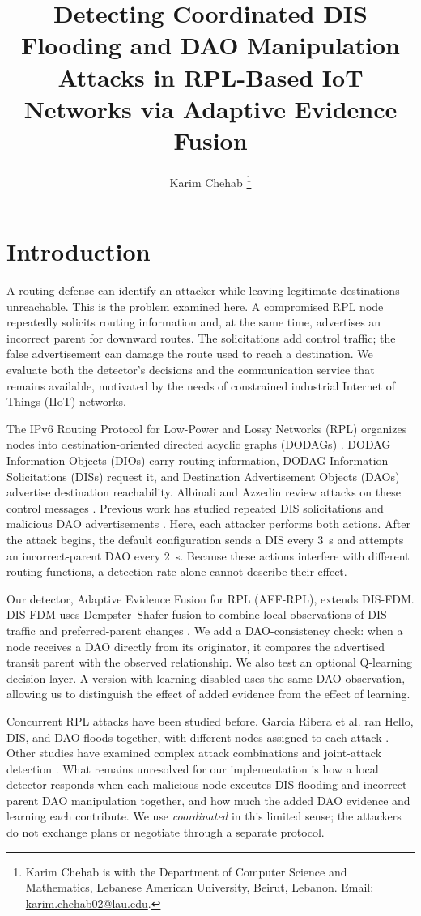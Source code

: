 \documentclass[journal]{IEEEtran}
\title{Detecting Coordinated DIS Flooding and DAO Manipulation Attacks in RPL-Based IoT Networks via Adaptive Evidence Fusion}
\author{Karim Chehab%
\thanks{Karim Chehab is with the Department of Computer Science and Mathematics, Lebanese American University, Beirut, Lebanon. Email: \href{mailto:karim.chehab02@lau.edu}{karim.chehab02@lau.edu}.}}
\date{}
\begin{document}
\maketitle

\section{Introduction}\label{sec:introduction}
A routing defense can identify an attacker while leaving legitimate destinations unreachable. This is the problem examined here. A compromised RPL node repeatedly solicits routing information and, at the same time, advertises an incorrect parent for downward routes. The solicitations add control traffic; the false advertisement can damage the route used to reach a destination. We evaluate both the detector's decisions and the communication service that remains available, motivated by the needs of constrained industrial Internet of Things (IIoT) networks.

The IPv6 Routing Protocol for Low-Power and Lossy Networks (RPL) organizes nodes into destination-oriented directed acyclic graphs (DODAGs) \cite{rfc6550}. DODAG Information Objects (DIOs) carry routing information, DODAG Information Solicitations (DISs) request it, and Destination Advertisement Objects (DAOs) advertise destination reachability. Albinali and Azzedin review attacks on these control messages \cite{albinali2024}. Previous work has studied repeated DIS solicitations \cite{rajasekar2022,vermaranga2020,medjek2021} and malicious DAO advertisements \cite{pu2018,limsd2024}. Here, each attacker performs both actions. After the attack begins, the default configuration sends a DIS every 3~s and attempts an incorrect-parent DAO every 2~s. Because these actions interfere with different routing functions, a detection rate alone cannot describe their effect.

Our detector, Adaptive Evidence Fusion for RPL (AEF-RPL), extends DIS-FDM. DIS-FDM uses Dempster--Shafer fusion to combine local observations of DIS traffic and preferred-parent changes \cite{prajisha2025}. We add a DAO-consistency check: when a node receives a DAO directly from its originator, it compares the advertised transit parent with the observed relationship. We also test an optional Q-learning decision layer. A version with learning disabled uses the same DAO observation, allowing us to distinguish the effect of added evidence from the effect of learning.

Concurrent RPL attacks have been studied before. Garcia Ribera et al. ran Hello, DIS, and DAO floods together, with different nodes assigned to each attack \cite{garciaribera2022}. Other studies have examined complex attack combinations and joint-attack detection \cite{alsukayti2023,de2rarpl2024,abdulkareem2024}. What remains unresolved for our implementation is how a local detector responds when each malicious node executes DIS flooding and incorrect-parent DAO manipulation together, and how much the added DAO evidence and learning each contribute. We use \emph{coordinated} in this limited sense; the attackers do not exchange plans or negotiate through a separate protocol.
\end{document}
